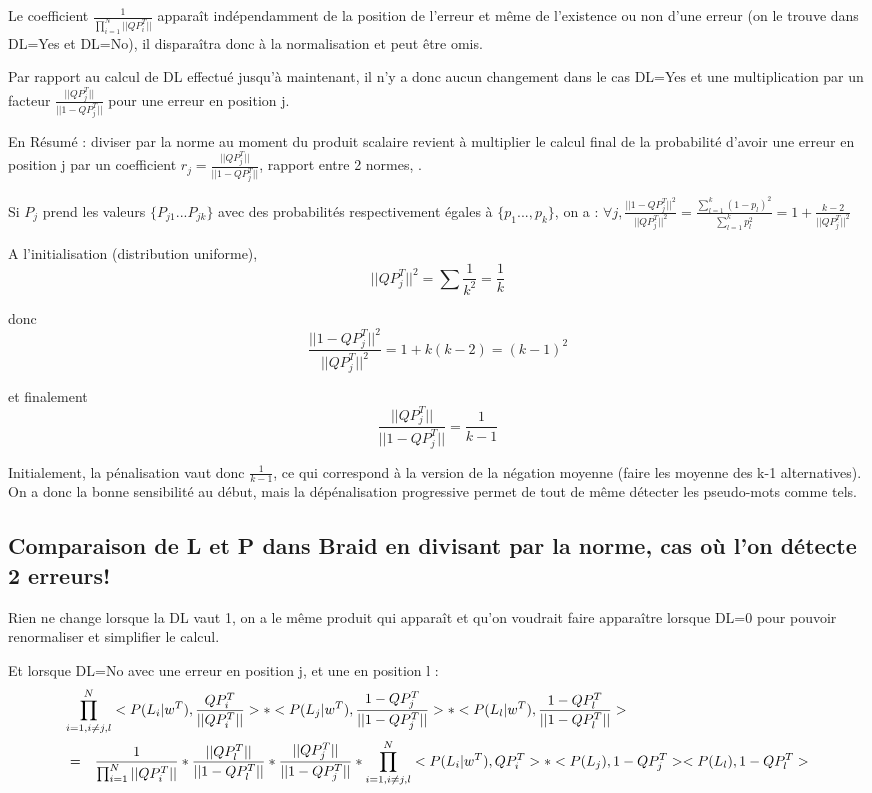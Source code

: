 \documentclass{article}
\begin{document}
     Le coefficient $\frac{1}{\prod_{i=1}^{N} ||QP_i^T||}$ apparaît indépendamment de la position de l'erreur et même de l'existence ou non d'une erreur (on le trouve dans DL=Yes et DL=No), il disparaîtra donc à la normalisation et peut être omis.
     
     Par rapport au calcul de DL effectué jusqu'à maintenant, il n'y a donc aucun changement dans le cas DL=Yes et une multiplication par un facteur $\frac{||QP_j^T|| }{||1-QP_j^T||}$ pour une erreur en position j.
     
     En Résumé : diviser par la norme au moment du produit scalaire revient à multiplier le calcul final de la probabilité d'avoir une erreur en position j par un coefficient $r_j=\frac{||QP_j^T|| }{||1-QP_j^T||}$, rapport entre 2 normes, .
     
     
     
    Si $P_j$ prend les valeurs $\{P_{j1}...P_{jk}\}$ avec des probabilités respectivement égales à $\{p_1...,p_k\}$, on a :
    $\forall j, \frac{||1-QP_j^T||^2}{||QP_j^T||^2}=\frac{\sum_{l=1}^{k}(1-p_l)^2}{\sum_{l=1}^{k}p_l^2}=1+\frac{k-2}{||QP_j^T||^2}$
    
    A l'initialisation (distribution uniforme), $$||QP_j^T||^2=\sum \frac{1}{k^2} = \frac{1}{k}$$
    
    donc $$\frac{||1-QP_j^T||^2}{||QP_j^T||^2}=1+k(k-2)=(k-1)^2$$
    
    et finalement
    $$\frac{||QP_j^T||}{||1-QP_j^T||}=\frac{1}{k-1}$$
    
    Initialement, la pénalisation vaut donc $\frac{1}{k-1}$, ce qui correspond à la version de la négation moyenne (faire les moyenne des k-1 alternatives).
    On a donc la bonne sensibilité au début, mais la dépénalisation progressive permet de tout de même détecter les pseudo-mots comme tels.
    
    
    \subsection{Comparaison de L et P dans Braid en divisant par la norme, cas où l'on détecte 2 erreurs!}
  
Rien ne change lorsque la DL vaut 1, on a le même produit qui apparaît et qu'on voudrait faire apparaître lorsque DL=0 pour pouvoir renormaliser et simplifier le calcul.
  
  Et lorsque DL=No avec une erreur en position j, et une en position l :
\begin{eqnarray}
\lefteqn{\prod_{i=1,i \neq j,l}^{N} <P(L_i|w^T),\frac{QP_i^T}{||QP_i^T||}> * <P(L_j|w^T),\frac{1-QP_j^T}{||1-QP_j^T||}> * <P(L_l|w^T),\frac{1-QP_l^T}{||1-QP_l^T||}> }\\
& = &\frac{1}{\prod_{i=1}^{N} ||QP_i^T||}*\frac{||QP_l^T|| }{||1-QP_l^T||} * \frac{||QP_j^T|| }{||1-QP_j^T||} * \prod_{i=1,i \neq j,l}^{N} <P(L_i|w^T),QP_i^T>* <P(L_j),1-QP_j^T> <P(L_l),1-QP_l^T>
\end{eqnarray}
     
\end{document}

